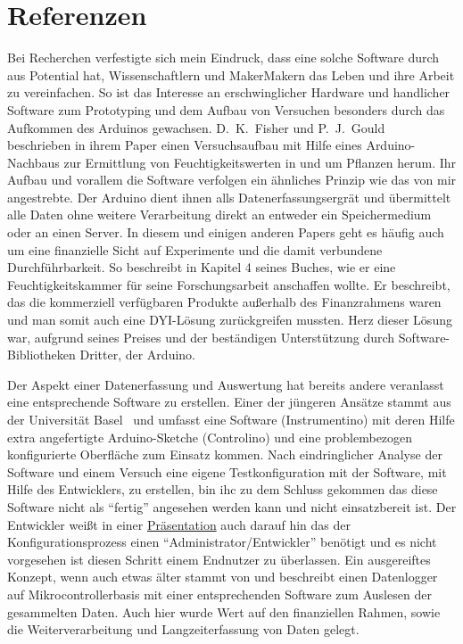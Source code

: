\section{Referenzen}
Bei Recherchen verfestigte sich mein Eindruck, dass eine solche Software durch aus Potential hat, Wissenschaftlern und \gls{Maker}{Makern} das Leben und ihre Arbeit zu vereinfachen. So ist das Interesse an erschwinglicher Hardware und handlicher 
Software zum Prototyping und dem Aufbau von Versuchen besonders durch das 
Aufkommen des Arduinos gewachsen. D.~K.~Fisher und P.~J.~Gould~\cite{ModernInstrumentation} beschrieben in ihrem Paper einen 
Versuchsaufbau mit Hilfe eines Arduino-Nachbaus zur Ermittlung von 
Feuchtigkeitswerten in und um Pflanzen herum. Ihr Aufbau und vorallem die 
Software verfolgen ein ähnliches Prinzip wie das von mir angestrebte. Der 
Arduino dient ihnen alls Datenerfassungsergrät und übermittelt alle Daten ohne 
weitere Verarbeitung direkt an entweder ein Speichermedium oder an einen 
Server. In diesem und einigen anderen Papers geht es häufig auch um eine finanzielle Sicht auf Experimente und die damit verbundene Durchführbarkeit. So beschreibt \citet{joshua_m._pearce_open-source_2014} in Kapitel 4 seines Buches, wie er eine Feuchtigkeitskammer für seine Forschungsarbeit anschaffen wollte. Er beschreibt, das die kommerziell verfügbaren Produkte außerhalb des Finanzrahmens waren und man somit auch eine \acrshort{DYI}-Lösung zurückgreifen mussten. Herz dieser Lösung war, aufgrund seines Preises und der beständigen Unterstützung durch Software-Bibliotheken Dritter, der Arduino.

Der Aspekt einer Datenerfassung und Auswertung hat bereits andere veranlasst 
eine entsprechende Software zu erstellen. Einer der jüngeren Ansätze stammt 
aus der Universität Basel~\cite{Instrumentino} und umfasst eine Software 
(Instrumentino) mit deren Hilfe extra angefertigte Arduino-Sketche (Controlino) 
und eine problembezogen konfigurierte Oberfläche zum Einsatz kommen. 
Nach eindringlicher Analyse der Software und einem Versuch eine eigene 
Testkonfiguration mit der Software, mit Hilfe des Entwicklers, zu erstellen, bin 
ihc zu dem Schluss gekommen das diese Software nicht als ``fertig'' angesehen 
werden kann und nicht einsatzbereit ist. Der Entwickler weißt in einer 
\href{https://github.com/yoelk/Instrumentino/blob/master/documents/Instrumentino\%20presentation.pptx}{Präsentation} auch darauf hin das der Konfigurationsprozess einen "`Administrator/Entwickler"' benötigt und es nicht vorgesehen ist diesen Schritt einem Endnutzer zu überlassen. 
Ein ausgereiftes Konzept, wenn auch etwas älter stammt von \citet{dedrick_inexpensive_2000} und beschreibt einen Datenlogger auf Mikrocontrollerbasis mit einer entsprechenden Software zum Auslesen der gesammelten Daten. Auch hier wurde Wert auf den finanziellen Rahmen, sowie die Weiterverarbeitung und Langzeiterfassung von Daten gelegt.
